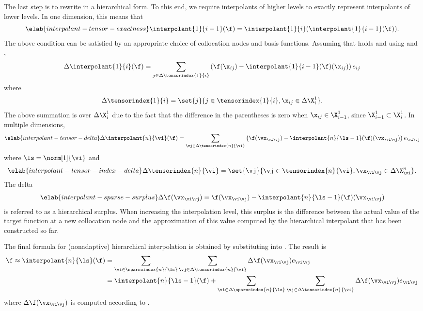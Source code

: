 The last step is to rewrite  in a
hierarchical form. To this end, we require interpolants of higher levels to
exactly represent interpolants of lower levels. In one dimension, this means
that
\begin{equation} \elab{interpolant-tensor-exactness}
  \interpolant{1}{i - 1}(\f) = \interpolant{1}{i}(\interpolant{1}{i - 1}(\f)).
\end{equation}
The above condition can be satisfied by an appropriate choice of collocation
nodes and basis functions. Assuming that 
holds and using  and ,
\[
  \Delta\interpolant{1}{i}(\f) = \sum_{j \in \Delta\tensorindex{1}{i}} \left(\f(\x_{ij}) - \interpolant{1}{i - 1}(\f)(\x_{ij})\right) e_{ij}
\]
where
\[
  \Delta\tensorindex{1}{i} = \set{j}{j \in \tensorindex{1}{i}, \x_{ij} \in \Delta\X^1_i}.
\]
The above summation is over $\Delta\X^1_i$ due to the fact that the difference
in the parentheses is zero when $\x_{ij} \in \X^1_{i - 1}$, since $\X^1_{i - 1}
\subset \X^1_i$. In multiple dimensions,
\begin{equation} \elab{interpolant-tensor-delta}
  \Delta\interpolant{n}{\vi}(\f) = \sum_{\vj \in \Delta\tensorindex{n}{\vi}} \left(\f(\vx_{\vi \vj}) - \interpolant{n}{\ls - 1}(\f)(\vx_{\vi \vj})\right) e_{\vi \vj}
\end{equation}
where $\ls = \norm[1]{\vi}$ and
\begin{equation} \elab{interpolant-tensor-index-delta}
  \Delta\tensorindex{n}{\vi} = \set{\vj}{\vj \in \tensorindex{n}{\vi}, \vx_{\vi \vj} \in \Delta\X^n_{\vi}}.
\end{equation}
The delta
\begin{equation} \elab{interpolant-sparse-surplus}
  \Delta\f(\vx_{\vi \vj}) = \f(\vx_{\vi \vj}) - \interpolant{n}{\ls - 1}(\f)(\vx_{\vi \vj})
\end{equation}
is referred to as a hierarchical surplus. When increasing the interpolation
level, this surplus is the difference between the actual value of the target
function at a new collocation node and the approximation of this value computed
by the hierarchical interpolant that has been constructed so far.

The final formula for (nonadaptive) hierarchical interpolation is obtained by
substituting  into
. The result is
\begin{align*}
  \f \approx \interpolant{n}{\ls}(\f)
  &= \sum_{\vi \in \sparseindex{n}{\ls}} \sum_{\vj \in \Delta\tensorindex{n}{\vi}} \Delta\f(\vx_{\vi \vj}) e_{\vi \vj} \\
  &= \interpolant{n}{\ls - 1}(\f) + \sum_{\vi \in \Delta\sparseindex{n}{\ls}} \sum_{\vj \in \Delta\tensorindex{n}{\vi}} \Delta\f(\vx_{\vi \vj}) e_{\vi \vj}
\end{align*}
where $\Delta\f(\vx_{\vi \vj})$ is computed according to
.
